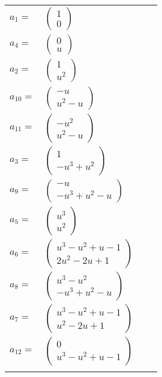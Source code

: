 \documentclass[1p]{elsarticle_modified}
\theoremstyle{definition}
\begin{document}
\begin{tabular}{m{7pt} m{180pt} m{7pt} m{180pt} }
\flushright $a_{1}=$&$\begin{pmatrix}1\\0\end{pmatrix}$ \\
\flushright $a_{4}=$&$\begin{pmatrix}0\\u\end{pmatrix}$ \\
\flushright $a_{2}=$&$\begin{pmatrix}1\\u^2\end{pmatrix}$ \\
\flushright $a_{10}=$&$\begin{pmatrix}- u\\u^2- u\end{pmatrix}$ \\
\flushright $a_{11}=$&$\begin{pmatrix}- u^2\\u^2- u\end{pmatrix}$ \\
\flushright $a_{3}=$&$\begin{pmatrix}1\\- u^3+u^2\end{pmatrix}$ \\
\flushright $a_{9}=$&$\begin{pmatrix}- u\\- u^3+u^2- u\end{pmatrix}$ \\
\flushright $a_{5}=$&$\begin{pmatrix}u^3\\u^2\end{pmatrix}$ \\
\flushright $a_{6}=$&$\begin{pmatrix}u^3- u^2+u-1\\2 u^2-2 u+1\end{pmatrix}$ \\
\flushright $a_{8}=$&$\begin{pmatrix}u^3- u^2\\- u^3+u^2- u\end{pmatrix}$ \\
\flushright $a_{7}=$&$\begin{pmatrix}u^3- u^2+u-1\\u^2-2 u+1\end{pmatrix}$ \\
\flushright $a_{12}=$&$\begin{pmatrix}0\\u^3- u^2+u-1\end{pmatrix}$\\&\end{tabular}
\end{document}
